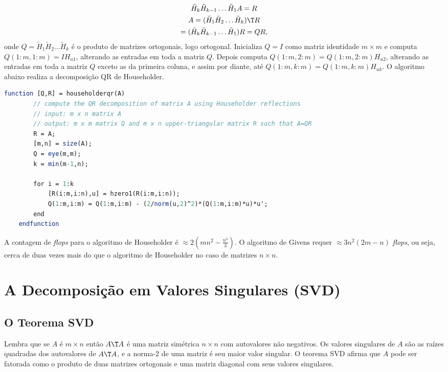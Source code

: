 \documentclass{article}
\begin{document}
\begin{gather}
    \tilde{H}_k \tilde{H}_{k-1} \ldots \tilde{H}_1 A = R \\
    A = (\tilde{H}_1 \tilde{H}_2 \ldots \tilde{H}_k)\T  R \\
    = (\tilde{H}_k \tilde{H}_{k-1} \ldots \tilde{H}_1) R = QR,
\end{gather}
onde \(Q = \tilde{H}_1 \tilde{H}_2 \ldots \tilde{H}_k\) é o produto de matrizes ortogonais, logo ortogonal. Inicializa \(Q=I\) como matriz identidade \(m\times m\) e computa \(Q(1:m,1:m) = I H_{u1}\), alterando as entradas em toda a matriz \(Q\). Depois computa \(Q(1:m,2:m) = Q(1:m,2:m)H_{u2}\), alterando as entradas em toda a matriz \(Q\) exceto as da primeira coluna, e assim por diante, até \(Q(1:m,k:m) = Q(1:m,k:m)H_{uk}\). O algoritmo abaixo realiza a decomposição QR de Householder.

\begin{lstlisting}[language=Scilab, caption=Decomposição QR de Householder]
    function [Q,R] = householderqr(A)
        // compute the QR decomposition of matrix A using Householder reflections
        // input: m x n matrix A
        // output: m x m matrix Q and m x n upper-triangular matrix R such that A=QR
        R = A;
        [m,n] = size(A);
        Q = eye(m,m);
        k = min(m-1,n);
        
        for i = 1:k
            [R(i:m,i:n),u] = hzero1(R(i:m,i:n));
            Q(1:m,i:m) = Q(1:m,i:m) - (2/norm(u,2)^2)*(Q(1:m,i:m)*u)*u';
        end
    endfunction
\end{lstlisting}

A contagem de \emph{flops} para o algoritmo de Householder é \(\approx 2\left(mn^2 - \frac{n^3}{3}\right)\). O algoritmo de Givens requer \(\approx 3n^2(2m-n)\) \emph{flops}, ou seja, cerca de duas vezes mais do que o algoritmo de Householder no caso de matrizes \(n \times n\).

\section{A Decomposição em Valores Singulares (SVD)}

\subsection{O Teorema SVD}

Lembra que se \(A\) é \(m \times n\) então \(A\T A\) é uma matriz simétrica \(n \times n\) com autovalores não negativos. Os valores singulares de \(A\) são as raízes quadradas dos autovalores de \(A\T A\), e a norma-\(2\) de uma matriz é seu maior valor singular. O teorema SVD afirma que \(A\) pode ser fatorada como o produto de duas matrizes ortogonais e uma matriz diagonal com seus valores singulares.
\end{document}
